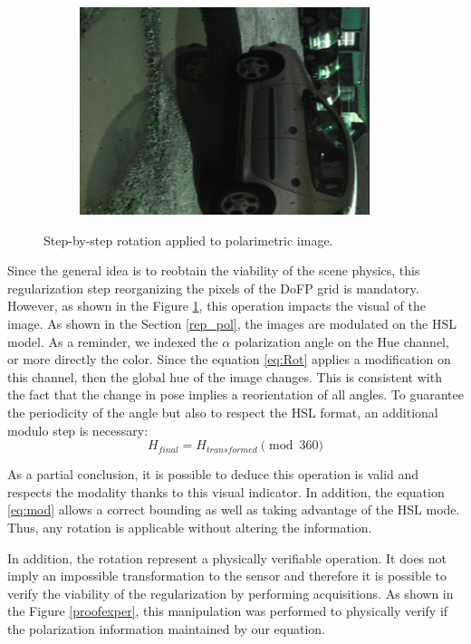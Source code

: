 \begin{figure}[h]
\begin{subfigure}[b]{0.32\linewidth}
		\includegraphics[width=\linewidth]{Figures/Aug/regularized_rot.png}
	\end{subfigure}

	\caption{Step-by-step rotation applied to polarimetric image.}\label{rotreal}
\end{figure}

Since the general idea is to reobtain the viability of the scene physics, this regularization step reorganizing the pixels of the DoFP grid is mandatory. However, as shown in the Figure \ref{rotreal}, this operation impacts the visual of the image. As shown in the Section \ref{rep_pol}, the images are modulated on the HSL model. As a reminder, we indexed the $\alpha$ polarization angle on the Hue channel, or more directly the color. Since the equation \ref{eq:Rot} applies a modification on this channel, then the global hue of the image changes. This is consistent with the fact that the change in pose implies a reorientation of all angles. To guarantee the periodicity of the angle but also to respect the HSL format, an additional modulo step is necessary:
\begin{equation}\label{eq:mod}
H_{final} = H_{transformed} \pmod{360}
\end{equation} 

As a partial conclusion, it is possible to deduce this operation is valid and respects the modality thanks to this visual indicator. In addition, the equation \ref{eq:mod} allows a correct bounding as well as taking advantage of the HSL mode. Thus, any rotation is applicable without altering the information.

In addition, the rotation represent a physically verifiable operation. It does not imply an impossible transformation to the sensor and therefore it is possible to verify the viability of the regularization by performing acquisitions.
As shown in the Figure \ref{proofexper}, this manipulation was performed to physically verify if the polarization information maintained by our equation.

